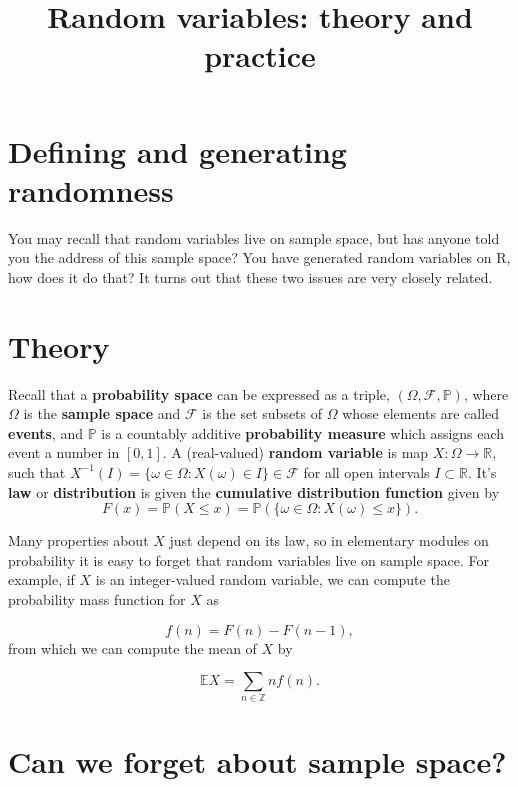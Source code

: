 \documentclass[
]{article}
\title{Random variables: theory and practice}
\author{}
\date{\vspace{-2.5em}}
\theoremstyle{definition}
\theoremstyle{definition}
\theoremstyle{definition}
\theoremstyle{definition}
\theoremstyle{remark}
\begin{document}
\maketitle

{
\setcounter{tocdepth}{2}
\tableofcontents
}
\hypertarget{defining-and-generating-randomness}{%
\section{Defining and generating randomness}\label{defining-and-generating-randomness}}

You may recall that random variables live on sample space, but has anyone told you the address of this sample space? You have generated random variables on R, how does it do that? It turns out that these two issues are very closely related.

\hypertarget{theory}{%
\section{Theory}\label{theory}}

Recall that a \textbf{probability space} can be expressed as a triple, \((\Omega, \mathcal{F}, \mathbb{P})\), where \(\Omega\) is the \textbf{sample space} and \(\mathcal{F}\) is the set subsets of \(\Omega\) whose elements are called \textbf{events}, and \(\mathbb{P}\) is a countably additive \textbf{probability measure} which assigns each event a number in \([0,1]\). A (real-valued) \textbf{random variable} is map \(X : \Omega \to \mathbb{R}\), such that \(X^{-1}(I) = \{\omega \in \Omega: X(\omega) \in I\} \in \mathcal{F}\) for all open intervals \(I \subset \mathbb{R}\). It's \textbf{law} or \textbf{distribution} is given the \textbf{cumulative distribution function} given by
\[F(x) = \mathbb{P}(X \leq x) = \mathbb{P}( \{ \omega \in \Omega:  X(\omega) \leq x\}).\]

Many properties about \(X\) just depend on its law, so in elementary modules on probability it is easy to forget that random variables live on sample space. For example, if \(X\) is an integer-valued random variable, we can compute the probability mass function for \(X\) as

\[f(n) = F(n) - F(n-1),\]
from which we can compute the mean of \(X\) by

\[\mathbb{E} X = \sum_{n \in \mathbb{Z}} n f(n).\]

\hypertarget{can-we-forget-about-sample-space}{%
\section{Can we forget about sample space?}\label{can-we-forget-about-sample-space}}
\end{document}
